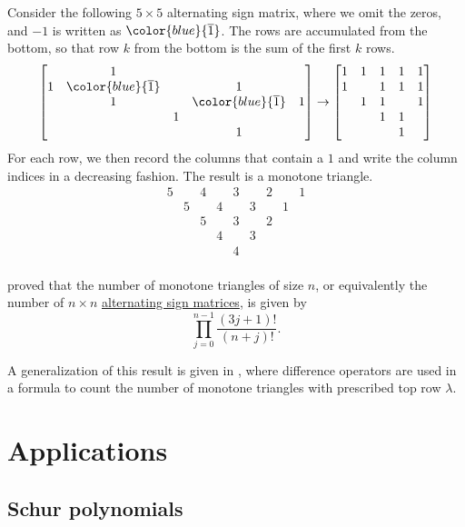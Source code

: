 \begin{example}
Consider the following $5\times 5$ alternating sign matrix, where we omit the zeros,
and $-1$ is written as $\color{blue}{\overline{1}}$.
The rows are accumulated from the bottom, so that row $k$ from the bottom
is the sum of the first $k$ rows.
\[
\begin{bmatrix}
 &1& & & \\
1&\color{blue}{\overline{1}}& &1& \\
 &1& &\color{blue}{\overline{1}}&1\\
 & &1& & \\
 & & &1&
\end{bmatrix}
\to
\begin{bmatrix}
1&1&1&1&1 \\
1& &1&1&1 \\
 &1&1& &1 \\
 & &1&1&  \\
 & & &1&
\end{bmatrix}
\]
For each row, we then record the columns that contain a $1$
and write the column indices in a decreasing fashion.
The result is a monotone triangle.
\[
\begin{matrix}
5&&4&&3&&2&&1 \\
&5&&4&&3&&1 \\
&&5&&3&&2 \\
&&&4&&3 \\
&&&&4& \\
\end{matrix}
\]
\end{example}

 \cite{Zeilberger1995} proved that the number of
monotone triangles of size $n$, or equivalently the number of $n\times n$
\hyperref[alternatingSignMatrixDefinition]{alternating sign matrices}, is
given by
\[
\prod_{j=0}^{n-1}\frac{(3j+1)!}{(n+j)!}.
\]

A generalization of this result is given in \cite{Fischer2006},
where difference operators are used in a formula to
count the number of monotone triangles with prescribed top row $\lambda$.


\section[gtApplications]{Applications}

\subsection[gtSchur]{Schur polynomials}

